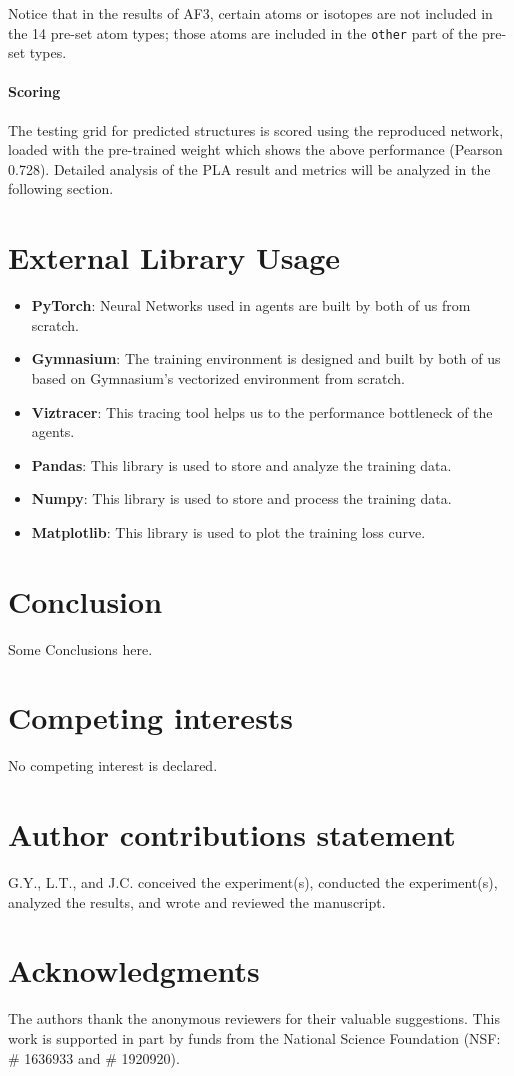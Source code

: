 \documentclass[unnumsec,webpdf,contemporary,large]{oup-authoring-template}
\theoremstyle{thmstyleone}%
\theoremstyle{thmstyletwo}%
\theoremstyle{thmstylethree}%
\begin{document}
Notice that in the results of AF3, certain atoms or isotopes are not included in the 14 pre-set atom types; those atoms are included in the \texttt{other} part of the pre-set types.

\paragraph{Scoring}
The testing grid for predicted structures is scored using the reproduced network, loaded with the pre-trained weight which shows the above performance (Pearson 0.728). Detailed analysis of the PLA result and metrics will be analyzed in the following section.

\section{External Library Usage}

\begin{itemize}
    \item \textbf{PyTorch}: Neural Networks used in agents are built by both of us from scratch.
    \item \textbf{Gymnasium}: The training environment is designed and built by both of us based on Gymnasium's vectorized environment from scratch.
    \item \textbf{Viztracer}: This tracing tool helps us to the performance bottleneck of the agents.
    \item \textbf{Pandas}: This library is used to store and analyze the training data.
    \item \textbf{Numpy}: This library is used to store and process the training data.
    \item \textbf{Matplotlib}: This library is used to plot the training loss curve.
\end{itemize}

\section{Conclusion}
Some Conclusions here.

\section{Competing interests}
No competing interest is declared.

\section{Author contributions statement}
G.Y., L.T., and J.C. conceived the experiment(s), conducted the experiment(s), analyzed the results, and wrote and reviewed the manuscript.

\section{Acknowledgments}
The authors thank the anonymous reviewers for their valuable suggestions. This work is supported in part by funds from the National Science Foundation (NSF: \# 1636933 and \# 1920920).

% 
% 
\end{document}
